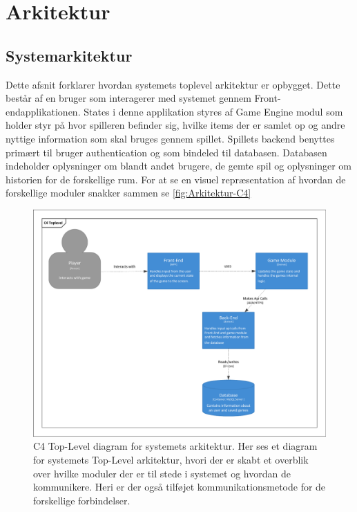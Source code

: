 \section{Arkitektur}

\subsection{Systemarkitektur}
\noindent
Dette afsnit forklarer hvordan systemets toplevel arkitektur er opbygget.
Dette består af en bruger som interagerer med systemet gennem Front-endapplikationen. States i denne applikation styres af Game Engine modul som holder styr på hvor spilleren befinder sig, hvilke items der er samlet op og andre nyttige information som skal bruges gennem spillet.
Spillets backend benyttes primært til bruger authentication og som bindeled til databasen.
Databasen indeholder oplysninger om blandt andet brugere, de gemte spil og oplysninger om historien for de forskellige rum.
For at se en visuel repræsentation af hvordan de forskellige moduler snakker sammen se \autoref{fig:Arkitektur-C4}

\begin{figure}[H]
\centering
\includegraphics[width = \textwidth]{02-Body/Images/Arkitektur-C4TopLevel.pdf}
\caption{C4 Top-Level diagram for systemets arkitektur. Her ses et diagram for systemets Top-Level arkitektur, hvori der er skabt et overblik over hvilke moduler der er til stede i systemet og hvordan de kommunikere. Heri er der også tilføjet kommunikationsmetode for de forskellige forbindelser.}
\label{fig:Arkitektur-C4}
\end{figure}






